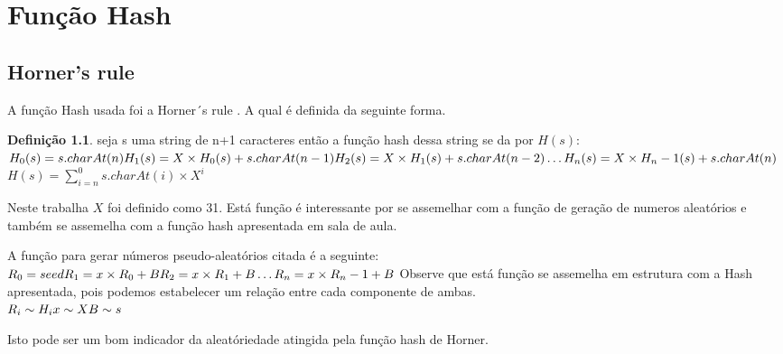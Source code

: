 \documentclass[12pt,openright,oneside,a4paper,brazil]{abntex2}
\theoremstyle{plain}
\theoremstyle{definition}
\newtheorem{definition}[lemma]{Definição}
\begin{document}
\imprimircapa
\newpage
\tableofcontents

\chapter{Função Hash}
\section{Horner's rule}
	A função Hash usada foi a Horner´s rule \cite{Fontes}.  A qual é definida da seguinte forma. 
	\begin{definition}
		seja s uma string de n+1 caracteres então a função hash dessa string se da por $H(s)$: \\
		$	H_0(s) = s.charAt(n)\\
		H_1(s)= X \times H_0(s) + s.charAt(n-1)\\
		H_2(s)= X \times H_1(s) + s.charAt(n-2) \\
		\ldots\\
		H_n(s)= X \times H_n-1(s) + s.charAt(n)$
		\newline
		\\
		
		\centering$H(s) = \sum\limits_{i=n}^{0} s.charAt(i)\times X^i$
		
		\end{definition}
Neste trabalha $X$ foi definido como 31. Está função é interessante por se assemelhar com a função de geração de numeros aleatórios e também se assemelha com a função hash apresentada em sala de aula. 

A função para gerar números pseudo-aleatórios citada é a seguinte: \\
 $ R_0 = seed\\
 R_1 = x \times R_0 + B\\
 R_2 = x \times R_1 + B\\
 \ldots\\
 R_n = x \times R_n-1 + B \\
$	
Observe que está função se assemelha em estrutura com a Hash apresentada, pois podemos estabelecer um relação entre cada componente de ambas. \\
$R_i \sim H_i\\
 x   \sim X\\
 B  \sim s $

Isto pode ser um bom indicador da aleatóriedade atingida pela função hash de Horner. \cite{Fontes}
\end{document}
